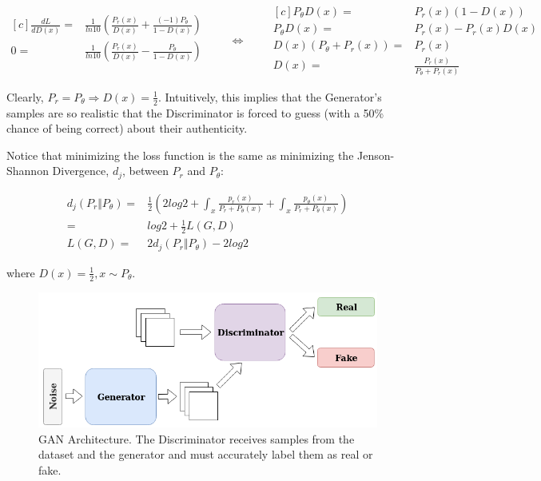 \begin{equation}
	\label{eq:optD}
	\begin{aligned}[c]
		\frac{d L}{d D(x)} =& \frac{1}{ln10} \left( \frac{P_r(x)}{D(x)} + \frac{(-1)P_\theta}{1-D(x)} \right) \\
		0 =& \frac{1}{ln10} \left( \frac{P_r(x)}{D(x)} - \frac{P_\theta}{1-D(x)} \right) \\
	\end{aligned}
	\qquad\Longleftrightarrow\qquad
	\begin{aligned}[c]
		P_\theta D(x) =& P_r(x) (1-D(x)) \\
		P_\theta D(x) =& P_r(x)-P_r(x) D(x) \\
		D(x)(P_\theta + P_r(x)) =& P_r(x) \\
		D(x) =& \frac{P_r(x)}{P_\theta + P_r(x)} 
	\end{aligned}
\end{equation}

Clearly, $P_r = P_\theta \Rightarrow D(x) = \frac{1}{2}$. Intuitively, this implies that the Generator's samples are so realistic that the Discriminator is forced to guess (with a 50\% chance of being correct) about their authenticity. 

Notice that minimizing the loss function is the same as minimizing the Jenson-Shannon Divergence, $d_j$, between $P_r$ and $P_\theta$:

\begin{align}
	d_j(P_r \Vert P_\theta) =& \frac{1}{2} \left( 2log2 + \int_{x}^{} \frac{p_r(x)}{P_r + P_\theta(x)} + \int_{x}^{} \frac{p_\theta(x)}{P_r + P_\theta(x)} \right) \nonumber \\
	=& log2 + \frac{1}{2} L(G, D) \nonumber \\
	L(G, D) =& 2d_j(P_r \Vert P_\theta) - 2log2
\end{align}

where $D(x) = \frac{1}{2}, x \sim P_\theta$. 

\begin{figure}[h!]
	\centering
	\includegraphics[width=0.8\linewidth]{media/gan.png}
	\caption{GAN Architecture. The Discriminator receives samples from the dataset and the generator and must accurately label them as real or fake.}
	\label{fig:gan}
\end{figure}

